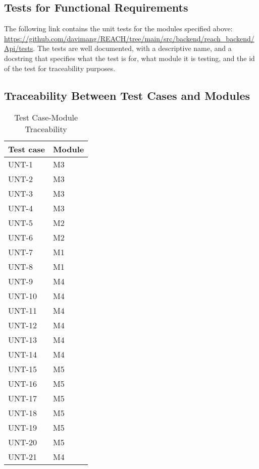 \documentclass[12pt, titlepage]{article}
\begin{document}
\subsection{Tests for Functional Requirements}

The following link contains the unit tests for the modules specified above: \url{https://github.com/davimang/REACH/tree/main/src/backend/reach_backend/Api/tests}.
The tests are well documented, with a descriptive name, and a docstring that specifies what the test is for, what module it is testing, and the id of the test for 
traceability purposes.

\subsection{Traceability Between Test Cases and Modules}
\begin{longtable}{|p{7cm}|p{7cm}|}
  \caption{Test Case-Module Traceability}\\ 
  \hline
  Test case & Module\\
  \hline
  UNT-1 & M3\\
  \hline
  UNT-2 & M3\\
  \hline
  UNT-3 & M3\\
  \hline
  UNT-4 & M3\\
  \hline
  UNT-5 & M2\\
  \hline
  UNT-6 & M2\\
  \hline
  UNT-7 & M1\\
  \hline
  UNT-8 & M1\\
  \hline
  UNT-9 & M4\\
  \hline
  UNT-10 & M4\\
  \hline
  UNT-11 & M4\\
  \hline
  UNT-12 & M4\\
  \hline
  UNT-13 & M4\\
  \hline
  UNT-14 & M4\\
  \hline
  UNT-15 & M5\\
  \hline
  UNT-16 & M5\\
  \hline
  UNT-17 & M5\\
  \hline
  UNT-18 & M5\\
  \hline
  UNT-19 & M5\\
  \hline
  UNT-20 & M5\\
  \hline
  UNT-21 & M4\\
  \hline
\end{longtable}

\newpage
				
\end{document}
